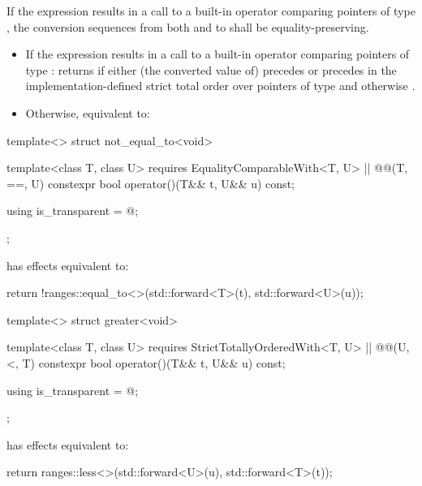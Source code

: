 {\begin{itemdescr}
\pnum
\requires If the expression 
results in a call to a built-in operator \tcode{==} comparing pointers of type
, the conversion sequences from both  and  to 
shall be equality-preserving.

\pnum
\effects
\begin{itemize}
\item
If the expression  results in a
call to a built-in operator \tcode{==} comparing pointers of type :
returns  if either (the converted value of)  precedes
 or  precedes  in the implementation-defined strict
total order over pointers of type  and otherwise .

\item
Otherwise, equivalent to: 
\end{itemize}
\end{itemdescr}

%
\begin{itemdecl}
template<> struct not_equal_to<void> {
  template<class T, class U>
    requires EqualityComparableWith<T, U> || @\textit{}@(T, ==, U)
  constexpr bool operator()(T&& t, U&& u) const;

  using is_transparent = @\unspecnc@;
};
\end{itemdecl}

\begin{itemdescr}
\pnum
{} has effects equivalent to:
\begin{codeblock}
return !ranges::equal_to<>{}(std::forward<T>(t), std::forward<U>(u));
\end{codeblock}
\end{itemdescr}

%
\begin{itemdecl}
template<> struct greater<void> {
  template<class T, class U>
    requires StrictTotallyOrderedWith<T, U> || @\textit{}@(U, <, T)
  constexpr bool operator()(T&& t, U&& u) const;

  using is_transparent = @\unspecnc@;
};
\end{itemdecl}

\begin{itemdescr}
\pnum
{} has effects equivalent to:
\begin{codeblock}
return ranges::less<>{}(std::forward<U>(u), std::forward<T>(t));
\end{codeblock}
\end{itemdescr}

}
